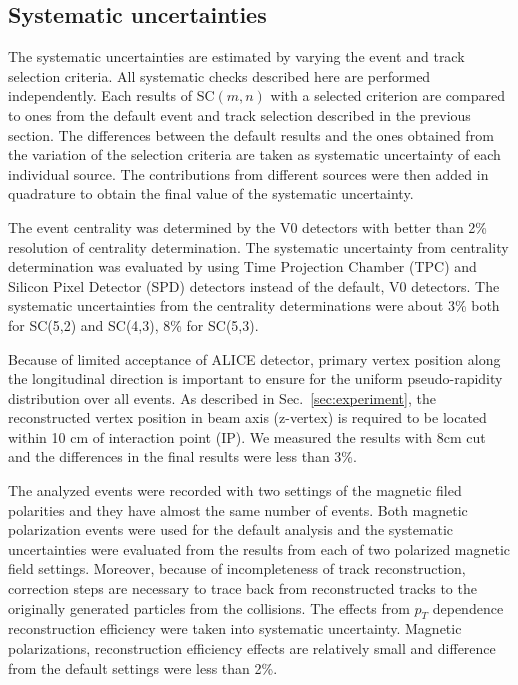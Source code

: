 

\subsection{Systematic uncertainties}
\label{sec:uncertainties}



The systematic uncertainties are estimated by varying the event and track selection criteria. All systematic checks described here are performed independently. 
Each results of SC$(m,n)$ with a selected criterion are compared to ones from the default event and track selection described in the previous section.
The differences between the default results and the ones obtained from the variation of the selection criteria are taken as systematic uncertainty of each individual source.
The contributions from different sources were then added in quadrature to obtain the final value of the systematic uncertainty.

The event centrality was determined by the V0 detectors \cite{Abbas:2013taa} with better than 2\%  resolution of centrality determination. The systematic uncertainty from centrality determination was evaluated by using Time Projection Chamber (TPC) and Silicon Pixel Detector (SPD) \cite{Dellacasa:1999kf} detectors instead of the default, V0 detectors. The systematic uncertainties from the centrality determinations were about 3\% both for SC(5,2) and SC(4,3), 8\% for  SC(5,3).

Because of limited acceptance of ALICE detector, primary vertex position along the longitudinal direction is important to ensure for the uniform pseudo-rapidity distribution over all events. As described in Sec.~\ref{sec:experiment}, the reconstructed vertex position in beam axis (z-vertex) is required to be located within 10 cm of interaction point (IP).  We measured the results with 8cm cut and the differences in the final results were less than 3\%.  

The analyzed events were recorded with two settings of the magnetic filed polarities and they have almost the same number of events. Both magnetic polarization events were used for the default analysis and the systematic uncertainties were evaluated from the results from each of two polarized magnetic field settings. 
Moreover, because of incompleteness of track reconstruction, correction steps are necessary to trace back from reconstructed tracks to the originally generated particles from the collisions. The effects from $p_T$ dependence reconstruction efficiency were taken into systematic uncertainty. Magnetic polarizations, reconstruction efficiency effects are relatively small and difference from the default settings were less than 2\%.

